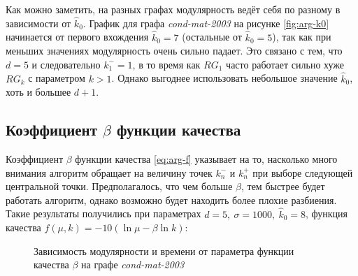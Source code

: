 Как можно заметить, на разных графах модулярность ведёт себя по разному в зависимости от $\hat{k}_0$. График для графа \emph{cond-mat-2003} на рисунке \ref{fig:arg-k0} начинается от первого вхождения $\hat{k}_0 = 7$ (остальные от $\hat{k}_0 = 5$), так как при меньших значениях модулярность очень сильно падает. Это связано с тем, что $d = 5$ и следовательно $k_1^{-} = 1$, в то время как $RG_1$ часто работает сильно хуже $RG_k$ с параметром $k > 1$. Однако выгоднее использовать небольшое значение $\hat{k}_0$, хоть и большее $d + 1$.



\subsection{Коэффициент $\beta$ функции качества}

Коэффициент $\beta$ функции качества \eqref{eq:arg-f} указывает на то, насколько много внимания алгоритм обращает на величину точек $k^{-}_n$ и $k^{+}_n$ при выборе следующей центральной точки. Предполагалось, что чем больше $\beta$, тем быстрее будет работать алгоритм, однако возможно будет находить более плохие разбиения. Такие результаты получились при параметрах $d = 5,\ \sigma = 1000,\ \hat{k}_0 = 8$, функция качества $f(\mu, k) = -10(\ln \mu - \beta \ln k)$:

\begin{figure}[H]
	\caption{Зависимость модулярности и времени от параметра функции качества $\beta$ на графе \emph{cond-mat-2003}}
\end{figure}


